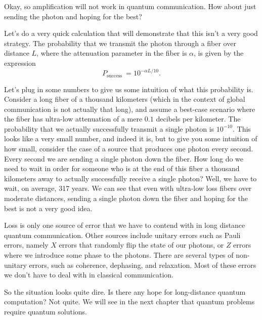 Okay, so amplification will not work in quantum communication. How about just sending the photon and hoping for the best?

Let's do a very quick calculation that will demonstrate that this isn't a very good strategy. The probability that we transmit the photon through a fiber over distance $L$, where the attenuation parameter in the fiber is $\alpha$, is given by the expression
\begin{equation}
P_{\text {success }}=10^{-\alpha L / 10}.
\end{equation}

Let's plug in some numbers to give us some intuition of what this probability is. Consider a long fiber of a thousand kilometers (which in the context of global communication is not actually that long), and assume a best-case scenario where the fiber has ultra-low attenuation of a mere $0.1$ decibels per kilometer. The probability that we actually successfully transmit a single photon is $10^{-10}$. This looks like a very small number, and indeed it is, but to give you some intuition of  how small, consider the case of a source that produces one photon every second. Every second we are sending a single photon down the fiber. How long do we need to wait in order for someone who is at the end of this fiber a thousand kilometers away to actually successfully receive a single photon? Well, we have to wait, on average, 317 years. We can see that even with ultra-low loss fibers over moderate distances, sending a single photon down the fiber and hoping for the best is not a very good idea.

Loss is only one source of error that we have to contend with in long distance quantum communication. Other sources include unitary errors such as Pauli errors, namely $X$ errors that randomly flip the state of our photons, or $Z$ errors where we introduce some phase to the photons. There are several types of non-unitary errors, such as coherence, dephasing, and relaxation.  Most of these errors we don't have to deal with in classical communication.

So the situation looks quite dire. Is there any hope for long-distance quantum computation? Not quite. We will see in the next chapter that quantum problems require quantum solutions.



\newpage
\begin{exercises}




\end{exercises}

